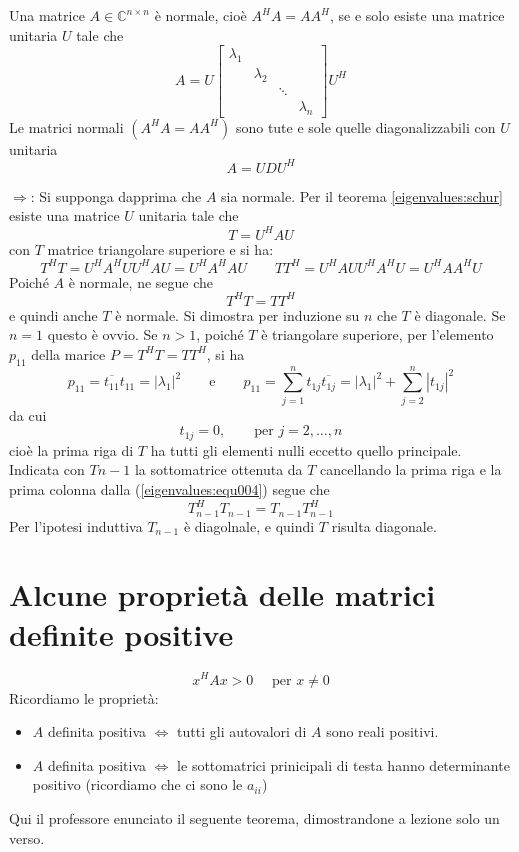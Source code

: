 \begin{theo}
Una matrice $A \in \mathbb{C}^{n\times n}$ \`e normale, cio\`e
$A^{H}A = AA^{H}$, se e solo esiste una matrice unitaria $U$ tale che
$$ A = U
\left[
\begin{array}{cccc}
\lambda_1 & & &  \\
& \lambda_2 & &  \\
 & & \ddots &  \\
 & &  & \lambda_n 
\end{array}
\right]
U^{H}
$$
 Le matrici normali  $(A^{H}A = AA^{H})$
 sono tute e sole quelle diagonalizzabili con $U$ unitaria 
 $$ A= UDU^{H}$$
\end{theo}
\begin{thproof}
 $\Longrightarrow$:
Si supponga dapprima che $A$ sia normale. Per il teorema
\ref{eigenvalues:schur}
esiste una matrice $U$ unitaria tale che
$$T = U^{H}AU$$
con $T$ matrice triangolare superiore e si ha:
$$ T^{H}T = U^{H}A^{H}UU^{H}AU = U^{H}A^{H}AU \qquad
TT^{H} = U^{H}AUU^{H}A^{H}U = U^{H}AA^{H}U $$
Poich\'e $A$ \`e normale, ne segue che
\begin{equation}
\label{eigenvalues:equ004}
 T^{H}T = TT^{H}
\end{equation}
e quindi anche $T$ \`e normale. Si dimostra per induzione su $n$
che $T$ \`e diagonale. Se $n=1$ questo \`e ovvio. Se
$n>1$, poich\'e $T$ \`e triangolare superiore, per l'elemento $p_{11}$
della marice $P=T^{H}T = TT^{H}$, si ha
$$p_{11} = \overline{t_{11}}t_{11} = | \lambda_1|^{2} 
\qquad \text{e} \qquad
p_{11} = \displaystyle \sum_{j=1}^{n} 
 t_{1j}\overline{t_{1j}} = |\lambda_1|^{2} + 
\displaystyle \sum_{j=2}^{n} |t_{1j}|^{2} $$
da cui
$$ t_{1j}=0, \qquad \text{per } j=2, \ldots, n$$
cio\`e la prima riga di $T$ ha tutti gli elementi nulli eccetto quello
principale. Indicata con $T{n-1}$ la sottomatrice ottenuta da $T$
cancellando la prima riga e la prima colonna dalla (\ref{eigenvalues:equ004})
segue che
$$T_{n-1}^{H} T_{n-1} = T_{n-1}T_{n-1}^{H}$$
Per l'ipotesi induttiva $T_{n-1}$ \`e diagolnale, e quindi
$T$ risulta diagonale.
\end{thproof}

\section{Alcune propriet\`a delle matrici definite positive}
 $$ x^{H}Ax > 0 \quad \text{ per } x\neq 0 $$ 
Ricordiamo le propriet\`a:
\begin{itemize}
 \item $A$ definita positiva $ \Longleftrightarrow $ tutti gli autovalori di $A$ sono reali positivi.
 \item $A$ definita positiva $ \Longleftrightarrow $  le sottomatrici prinicipali di testa
hanno determinante positivo (ricordiamo che ci sono le $a_{ii}$)
\end{itemize}
\begin{notes}
 Qui il professore enunciato il seguente teorema, dimostrandone a
 lezione solo un verso.
\end{notes}


